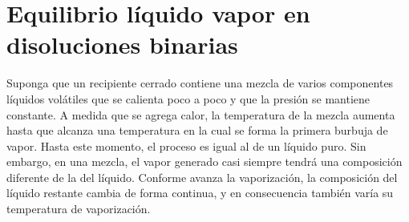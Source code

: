 \documentclass[11pt,letterpaper]{article}
\begin{document}
	
	\section{Equilibrio líquido vapor en disoluciones binarias}
	
	Suponga que un recipiente cerrado contiene una mezcla de varios componentes líquidos volátiles que se calienta poco a poco y que la presión se mantiene constante. A medida que se agrega calor, la temperatura de la mezcla aumenta hasta que alcanza una temperatura en la cual se forma la primera burbuja de vapor. Hasta este momento, el proceso es igual al de un líquido puro. Sin embargo, en una mezcla, el vapor generado casi siempre tendrá una composición diferente de la del líquido. Conforme avanza la vaporización, la composición del líquido restante cambia de forma continua, y en consecuencia también varía su temperatura de vaporización.
\end{document}
